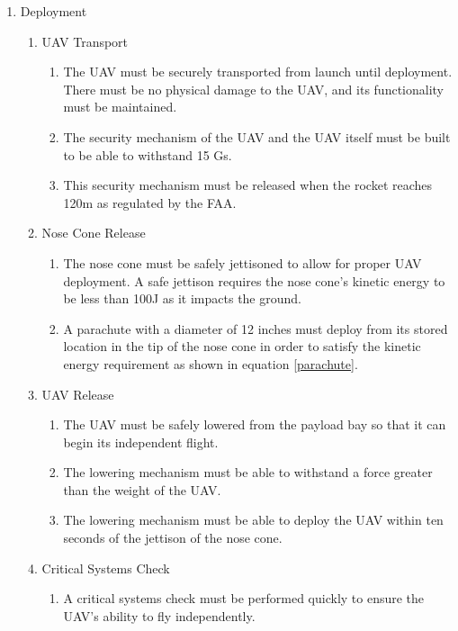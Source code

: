 	\begin{enumerate}[noitemsep, label=\arabic*.]
		\item Deployment
			\begin{enumerate}[noitemsep, label=1.\arabic*.]
				\item UAV Transport 
					\begin{enumerate}[noitemsep, label=1.1.\arabic*.]
						\item The UAV must be securely transported from launch until deployment. There must be no physical damage to the UAV, and its functionality must be maintained.
						\item The security mechanism of the UAV and the UAV itself must be built to be able to withstand 15 Gs. 
						\item This security mechanism must be released when the rocket reaches 120m as regulated by the FAA. 
					\end{enumerate}
				\item Nose Cone Release
					\begin{enumerate}[noitemsep, label=1.2.\arabic*.]
						\item The nose cone must be safely jettisoned to allow for proper UAV deployment. A safe jettison requires the nose cone's kinetic energy to be less than 100J as it impacts the ground.
						\item A parachute with a diameter of 12 inches must deploy from its stored location in the tip of the nose cone in order to satisfy the kinetic energy requirement as shown in equation \ref{parachute}.
					\end{enumerate}
				\item UAV Release
					\begin{enumerate}[noitemsep, label=1.3.\arabic*.]
						\item The UAV must be safely lowered from the payload bay so that it can begin its independent flight.
						\item The lowering mechanism must be able to withstand a force greater than the weight of the UAV.
						\item The lowering mechanism must be able to deploy the UAV within ten seconds of the jettison of the nose cone.
					\end{enumerate}
				\item Critical Systems Check
					\begin{enumerate}[noitemsep, label=1.4.\arabic*.]
						\item A critical systems check must be performed quickly to ensure the UAV's ability to fly independently.

\end{enumerate}
\end{enumerate}
\end{enumerate}
